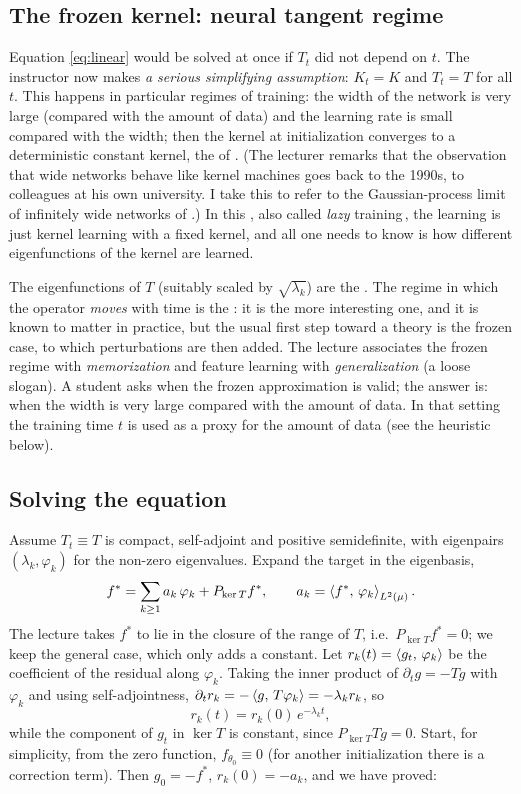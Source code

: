 \subsection{The frozen kernel: neural tangent regime}
Equation \eqref{eq:linear} would be solved at once if $T_t$ did not depend on $t$. The instructor now makes \emph{a serious simplifying assumption}: $K_t=K$ and $T_t=T$ for all $t$. This happens in particular regimes of training:
the width of the network is very large (compared with the amount of data) and the learning rate is small compared with the width; then the kernel at initialization converges to a deterministic constant kernel, the  of \citet{jacot2018}.
(The lecturer remarks that the observation that wide networks behave like kernel machines goes back to the 1990s, to colleagues at his own university.\dagmark{} I take this to refer to the Gaussian-process limit of infinitely wide networks of \citet{neal1996}.) In this , also called \emph{lazy} training\,\citep{chizat2019}, the learning is just kernel learning with a fixed kernel, and all one needs to know is
how different eigenfunctions of the kernel are learned.
\begin{discussion}
The eigenfunctions of $T$ (suitably scaled by $\sqrt{\lambda_k}$) are the . The regime in which the operator \emph{moves} with time is the : it is the more interesting one, and it is known to matter in practice, but the usual first step toward a theory is the frozen case, to which perturbations are then added. The lecture associates the frozen regime with \emph{memorization} and feature learning with \emph{generalization} (a loose slogan).
A student asks when the frozen approximation is valid; the answer is: when the width is very large compared with the amount of data. In that setting the training time $t$ is used as a proxy for the amount of data (see the heuristic below).
\end{discussion}

\subsection{Solving the equation}
Assume $T_t\equiv T$ is compact, self-adjoint and positive semidefinite, with eigenpairs $(\lambda_k,\varphi_k)$ for the non-zero eigenvalues. Expand the target in the eigenbasis,
\[
   f^*=\sum_{k\ge1}a_k\,\varphi_k+P_{\ker T}f^*,\qquad a_k=\left\langle f^*,\,\varphi_k\right\rangle_{L^2(\mu)}.
\]
The lecture takes $f^*$ to lie in the closure of the range of $T$, i.e.\ $P_{\ker T}f^*=0$; we keep the general case, which only adds a constant. Let $r_k(t)=\left\langle g_t,\,\varphi_k\right\rangle$ be the coefficient of the residual along $\varphi_k$. Taking the inner product of $\partial_tg=-Tg$ with $\varphi_k$ and using self-adjointness, $\partial_tr_k=-\left\langle g,\,T\varphi_k\right\rangle=-\lambda_kr_k$, so
\[
   r_k(t)=r_k(0)\,e^{-\lambda_kt},
\]
while the component of $g_t$ in $\ker T$ is constant, since $P_{\ker T}Tg=0$. Start, for simplicity, from the zero function, $f_{\theta_0}\equiv0$ (for another initialization there is a correction term). Then $g_0=-f^*$, $r_k(0)=-a_k$, and we have proved:

